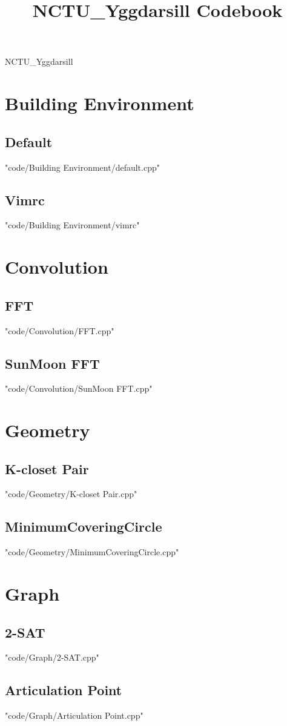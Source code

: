 \documentclass [landscape,8pt,a4paper,twocolumn]{article}
\title {NCTU\_Yggdarsill Codebook}
\begin{document}
\thispagestyle{fancy}
{ \Huge NCTU\_Yggdarsill}
\tableofcontents

\section{Building Environment}
\subsection{Default}
 {"code/Building Environment/default.cpp"}
\subsection{Vimrc}
 {"code/Building Environment/vimrc"}
\section{Convolution}
\subsection{FFT}
 {"code/Convolution/FFT.cpp"}
\subsection{SunMoon FFT}
 {"code/Convolution/SunMoon FFT.cpp"}
\section{Geometry}
\subsection{K-closet Pair}
 {"code/Geometry/K-closet Pair.cpp"}
\subsection{MinimumCoveringCircle}
 {"code/Geometry/MinimumCoveringCircle.cpp"}
\section{Graph}
\subsection{2-SAT}
 {"code/Graph/2-SAT.cpp"}
\subsection{Articulation Point}
 {"code/Graph/Articulation Point.cpp"}
\end{document}
